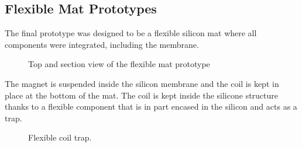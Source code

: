 \subsection{Flexible Mat Prototypes}
The final prototype was designed to be a flexible silicon mat where all components were integrated, including the membrane.

\newsavebox{\largestimage}
\begin{figure}[H]
    \centering
    \begin{subcaptiongroup}
        \centering
        \parbox[b]{0.2\textwidth}{
            \centering
            \usebox{
                \largestimage
            }
        }
        \parbox[b]{0.2\textwidth}{
            \centering
        }
    \end{subcaptiongroup}
    \caption{Top and section view of the flexible mat prototype}
\end{figure}
The magnet is suspended inside the silicon membrane and the coil is kept in place at the bottom of the mat.
The coil is kept inside the silicone structure thanks to a flexible component that is in part encased in the silicon and acts as a trap.

\newsavebox{\bigimage}
\begin{figure}[H]
    \centering
    \begin{subcaptiongroup}
        \centering
        \parbox[b]{0.2\textwidth}{
            \centering
        }
        \parbox[b]{0.2\textwidth}{
            \centering
            \usebox{
                \bigimage
            }
        }
        
    \end{subcaptiongroup}
    \caption{Flexible coil trap.}
\end{figure}

